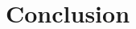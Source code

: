 \documentclass[conference]{IEEEtran}
\begin{document}
% 


\section{Conclusion}



%

\begin{spacing}{0.81}


\end{spacing}
\end{document}
